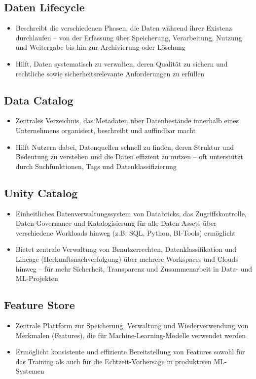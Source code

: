 \documentclass[11pt]{scrartcl}
\begin{document}
\subsection{Daten Lifecycle}
\begin{itemize}
	\item Beschreibt die verschiedenen Phasen, die Daten während ihrer Existenz durchlaufen – von der Erfassung über Speicherung, Verarbeitung, Nutzung und Weitergabe bis hin zur Archivierung oder Löschung
	\item Hilft, Daten systematisch zu verwalten, deren Qualität zu sichern und rechtliche sowie sicherheitsrelevante Anforderungen zu erfüllen	
\end{itemize}


\subsection{Data Catalog}
\begin{itemize}
	\item Zentrales Verzeichnis, das Metadaten über Datenbestände innerhalb eines Unternehmens organisiert, beschreibt und auffindbar macht
	\item Hilft Nutzern dabei, Datenquellen schnell zu finden, deren Struktur und Bedeutung zu verstehen und die Daten effizient zu nutzen – oft unterstützt durch Suchfunktionen, Tags und Datenklassifizierung
\end{itemize}


\subsection{Unity Catalog}
\begin{itemize}
	\item Einheitliches Datenverwaltungssystem von Databricks, das Zugriffskontrolle, Daten-Governance und Katalogisierung für alle Daten-Assets über verschiedene Workloads hinweg (z.B. SQL, Python, BI-Tools) ermöglicht
	\item Bietet zentrale Verwaltung von Benutzerrechten, Datenklassifikation und Lineage (Herkunftsnachverfolgung) über mehrere Workspaces und Clouds hinweg – für mehr Sicherheit, Transparenz und Zusammenarbeit in Data- und ML-Projekten
\end{itemize}


\subsection{Feature Store}
\begin{itemize}
\item Zentrale Plattform zur Speicherung, Verwaltung und Wiederverwendung von Merkmalen (Features), die für Machine-Learning-Modelle verwendet werden
\item Ermöglicht konsistente und effiziente Bereitstellung von Features sowohl für das Training als auch für die Echtzeit-Vorhersage in produktiven ML-Systemen
\end{itemize}
\end{document}

